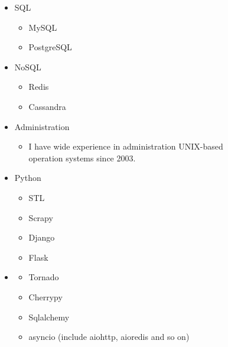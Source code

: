 \documentclass[letterpaper,11pt]{article}
\begin{document}
\begin{figure}[h!]
\begin{minipage}[h!]{0.49\textwidth}
      \begin{itemize}
        \item{SQL}
          \begin{itemize}
            \item MySQL
	    \item PostgreSQL
         \end{itemize}
        \item{NoSQL}
          \begin{itemize}
            \item Redis
	    \item Cassandra
          \end{itemize}
        \item{Administration}
          \begin{itemize}
            \item I have wide experience in administration UNIX-based operation systems since 2003.
          \end{itemize}
      \end{itemize}
    \end{minipage}
  \end{figure}
  \begin{figure}[h!]
    \begin{minipage}[h!]{0.49\textwidth}
      \begin{itemize}
      \item{Python}
        \begin{itemize}
	  \item STL
          \item Scrapy
          \item Django
	  \item Flask
        \end{itemize}
      \end{itemize}
    \end{minipage}
    \begin{minipage}[h!]{0.49\textwidth}
      \begin{itemize}
        \item{}
          \begin{itemize}
	    \item Tornado
            \item Cherrypy
            \item Sqlalchemy
            \item asyncio (include aiohttp, aioredis and so on)
          \end{itemize}
      \end{itemize}
    \end{minipage}
  \end{figure}
  
\end{document}
